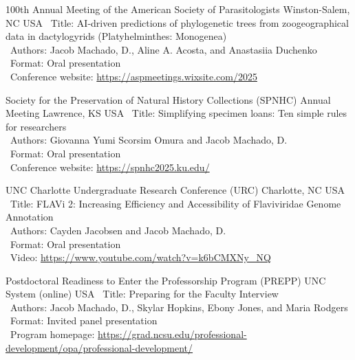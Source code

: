 \documentclass[11pt, letterpaper, sans]{moderncv}
\begin{document}
    {100th Annual Meeting of the American Society of Parasitologists}
    {Winston-Salem, NC}
    {USA}
    {}
    {
        \textbullet~Title: AI-driven predictions of phylogenetic trees from zoogeographical data in dactylogyrids (Platyhelminthes: Monogenea)\\
        \textbullet~Authors: Jacob Machado, D., Aline A. Acosta, and Anastasiia Duchenko\\
        \textbullet~Format: Oral presentation\\
        \textbullet~Conference website: \url{https://aspmeetings.wixsite.com/2025}
    }

    {Society for the Preservation of Natural History Collections (SPNHC) Annual Meeting}
    {Lawrence, KS}
    {USA}
    {}
    {
        \textbullet~Title: Simplifying specimen loans: Ten simple rules for researchers\\
        \textbullet~Authors: Giovanna Yumi Scorsim Omura and Jacob Machado, D.\\
        \textbullet~Format: Oral presentation\\
        \textbullet~Conference website: \url{https://spnhc2025.ku.edu/}
    }

    {UNC Charlotte Undergraduate Research Conference (URC)}
    {Charlotte, NC}
    {USA}
    {}
    {
        \textbullet~Title: FLAVi 2: Increasing Efficiency and Accessibility of Flaviviridae Genome Annotation\\
        \textbullet~Authors: Cayden Jacobsen and Jacob Machado, D.\\
        \textbullet~Format: Oral presentation\\
        \textbullet~Video: \url{https://www.youtube.com/watch?v=k6bCMXNy_NQ}
    }

    {Postdoctoral Readiness to Enter the Professorship Program (PREPP)}
    {UNC System (online)}
    {USA}
    {}
    {
        \textbullet~Title: Preparing for the Faculty Interview\\
        \textbullet~Authors: Jacob Machado, D., Skylar Hopkins, Ebony Jones, and Maria Rodgers\\
        \textbullet~Format: Invited panel presentation\\
        \textbullet~Program homepage: \url{https://grad.ncsu.edu/professional-development/opa/professional-development/}
    }
\end{document}
